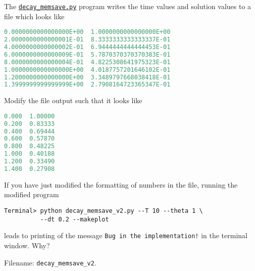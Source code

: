 \documentclass[graybox,sectrefs,envcountresetchap,open=right,final]{svmonodo}
\makeatletter
\newenvironment{doconceexercise}{}{}
\newcounter{doconceexercisecounter}%
\newcommand\listofexercises{
\chapter*{List of Exercises, Problems, and Projects
          \@mkboth{List of Exercises, Problems, and Projects}{List of Exercises, Problems, and Projects}}
\markboth{List of Exercises, Problems, and Projects}{List of Exercises, Problems, and Projects}
\@starttoc{loe}
}
\makeatother
\begin{document}
\begin{doconceexercise}

                
\label{decay:exer:inexact:output}

The \href{{http://tinyurl.com/ofkw6kc/alg/decay_memsave.py}}{\nolinkurl{decay_memsave.py}} program
writes the time values and solution values to a file which looks
like









\begin{lstlisting}[language=Python,style=gray]
0.0000000000000000E+00  1.0000000000000000E+00
2.0000000000000001E-01  8.3333333333333337E-01
4.0000000000000002E-01  6.9444444444444453E-01
6.0000000000000009E-01  5.7870370370370383E-01
8.0000000000000004E-01  4.8225308641975323E-01
1.0000000000000000E+00  4.0187757201646102E-01
1.2000000000000000E+00  3.3489797668038418E-01
1.3999999999999999E+00  2.7908164723365347E-01

\end{lstlisting}

Modify the file output such that it looks like









\begin{lstlisting}[language=Python,style=gray]
0.000  1.00000
0.200  0.83333
0.400  0.69444
0.600  0.57870
0.800  0.48225
1.000  0.40188
1.200  0.33490
1.400  0.27908

\end{lstlisting}

If you have just modified the formatting of numbers in the file,
running the modified program



\begin{Verbatim}[frame=lines,label=\fbox{{\tiny Terminal}},framesep=2.5mm,framerule=0.7pt,fontsize=\fontsize{9pt}{9pt}]
Terminal> python decay_memsave_v2.py --T 10 --theta 1 \ 
          --dt 0.2 --makeplot

\end{Verbatim}

leads to printing of the message \Verb?Bug in the implementation!? in the
terminal window. Why?

\noindent Filename: \Verb!decay_memsave_v2!.

\end{doconceexercise}
\end{document}
